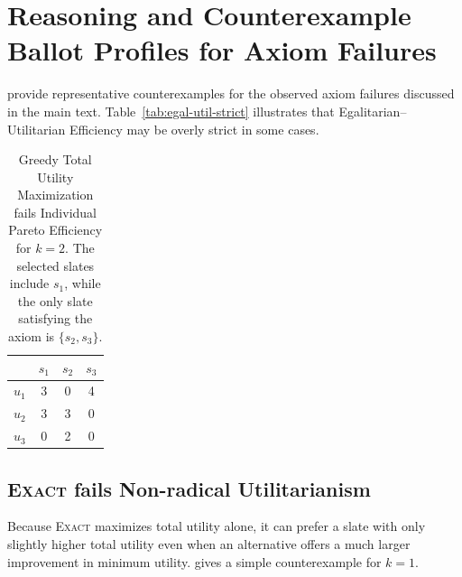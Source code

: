 \documentclass[11pt]{article}
\newcommand{\Exact}{\textsc{Exact}}
\begin{document}


\section{Reasoning and Counterexample Ballot Profiles for Axiom Failures}
\label{app:voting-failures}

provide representative counterexamples for the observed axiom failures discussed in the main text. Table~\ref{tab:egal-util-strict} illustrates that Egalitarian--Utilitarian Efficiency may be overly strict in some cases.

\begin{table}[t]
\centering
\begin{tabular}{lccc}
\hline
 & $s_1$ & $s_2$ & $s_3$ \\
\hline
$u_1$ & 3 & 0 & 4 \\
$u_2$ & 3 & 3 & 0 \\
$u_3$ & 0 & 2 & 0 \\
\hline
\end{tabular}
\caption{Greedy Total Utility Maximization fails Individual Pareto Efficiency for $k=2$. The selected slates include \(s_1\), while the only slate satisfying the axiom is \(\{s_2,s_3\}\).}
\label{tab:failure-greedy-indiv-pareto}
\end{table}

\subsection{\Exact{} fails Non-radical Utilitarianism}

Because \Exact{} maximizes total utility alone, it can prefer a slate with only slightly higher total utility even when an alternative offers a much larger improvement in minimum utility.  gives a simple counterexample for \(k=1\).
\end{document}
